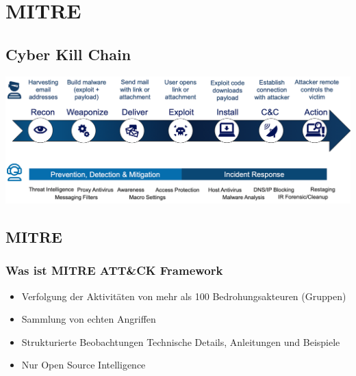 

\section{MITRE}
\subsection{Cyber Kill Chain}
\begin{center}
    \includegraphics[width=1.0\linewidth]{./img/06-mitre/cyber_kill_chain}
    \vspace{-8pt}
\end{center}


\subsection{MITRE}
\subsubsection{Was ist MITRE ATT\&CK Framework}
\begin{itemize}
    \item Verfolgung der Aktivitäten von mehr als 100 Bedrohungsakteuren (Gruppen)
    \item Sammlung von echten Angriffen
    \item Strukturierte Beobachtungen Technische Details, Anleitungen und Beispiele
    \item Nur Open Source Intelligence
\end{itemize}

